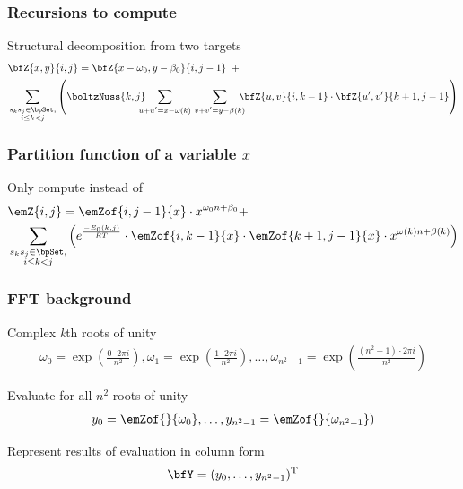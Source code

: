 \documentclass{beamer}
\begin{document}
\begin{frame}
	\frametitle{Recursions to compute }
	\begin{block}
		{Structural decomposition from two targets}
		\begin{align*}
			\begin{split}
				& \bfZ{x,y}{i,j} = \bfZ{x- \omega_0,y-\beta_0}{i,j-1}\enspace + \\
				& \sum_{\substack{s_k s_j \in \bpSet, \\
				i \le k<j}} \left( \boltzNuss{k,j}\quad \sum_{\mathclap{u+u'=x- \omega(k)}}\hspace{3.75em} \sum_{\mathclap{v+v'=y-\beta(k)}}\quad \bfZ{u,v}{i,k-1} \cdot \bfZ{u',v'}{k+1,j-1} \right)
			\end{split}
		\end{align*}
	\end{block}
\end{frame}

\begin{frame}
	\frametitle{Partition function of a variable $x$}
	\begin{block}
		{Only compute  instead of }
		\begin{align*}
			\begin{split}
				& \emZ{i,j} = \emZof{i,j-1}{x} \cdot x^{ \omega_0n+\beta_0} + \\
				&\sum_{\substack{s_k s_j \in \bpSet,\\i\le k<j}} \left(e^{\frac{-E_0(k,j)}{RT}}\cdot \emZof{i,k-1}{x} \cdot \emZof{k+1,j-1}{x}\cdot x^{ \omega(k)n+\beta(k)} \right)
			\end{split}
		\end{align*}
	\end{block}
\end{frame}

\begin{frame}
	\frametitle{FFT background}
	\begin{block}
		{Complex {\em k}th roots of unity}
		\begin{align*}
			\omega_0=\exp(\frac{0\cdot 2\pi i}{n^2}), \omega_1=\exp(\frac{1\cdot 2\pi i}{n^2}),\dots, \omega_{n^2-1}=\exp(\frac{(n^2-1)\cdot 2\pi i}{n^2})
		\end{align*}
	\end{block}
	\begin{block}
		{Evaluate  for all $n^2$ roots of unity}
		\begin{align*}
			y_0=\emZof{}{ \omega_0},\dots,y_{n^2-1}=\emZof{}{ \omega_{n^2-1}})
		\end{align*}
	\end{block}
	\begin{block}
		{Represent results of evaluation in column form}
		\begin{align*}
			\bfY = (y_0,\dots,y_{n^2-1})^{\text T}
		\end{align*}
	\end{block}
\end{frame}
\end{document}
